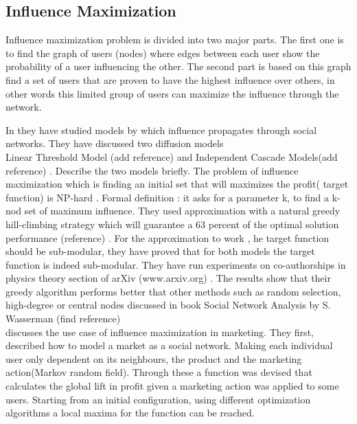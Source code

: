 \documentclass[english]{tktltiki}
\begin{document}
\subsection{Influence Maximization}
Influence maximization problem is divided into two major parts. The first one is to find the graph of users (nodes) where edges between each user show the probability of  a user influencing the other. The second part is
based on this graph find a set of users that are proven to have the highest influence over others, in other words 
this limited group of users can maximize the influence through the network.



In \cite{kempe03} they have studied models by which influence propagates through social networks. They have discussed two diffusion models \\
Linear Threshold Model (add reference) and Independent Cascade Models(add reference) . Describe the two models briefly. 
The problem of influence maximization which is finding an initial set that will maximizes the profit( target function) is NP-hard . 
Formal definition : it asks for a parameter k, to find a k-nod set of maximum influence. They used approximation with a natural greedy hill-climbing strategy which will guarantee a 63 percent of the optimal solution performance (reference) . For the approximation to work , he target function should be sub-modular, they have proved that for both models the target function is indeed sub-modular.  They have run experiments on co-authorships in physics theory section of arXiv (www.arxiv.org) . The results show that their greedy algorithm performs better that other methods such as random selection, high-degree or central nodes discussed in book Social Network Analysis by S. Wasserman (find reference) \\
\cite{domingo01} discusses the use case of influence maximization in marketing. They first, described how to model a market as a social network. Making each individual user only dependent on its neighbours, the product and the marketing action(Markov random field). Through these a function was devised that calculates the global lift in profit given a marketing action was applied to some users. Starting from an initial configuration, using different optimization algorithms a local maxima for the function can be reached. 
\end{document}
